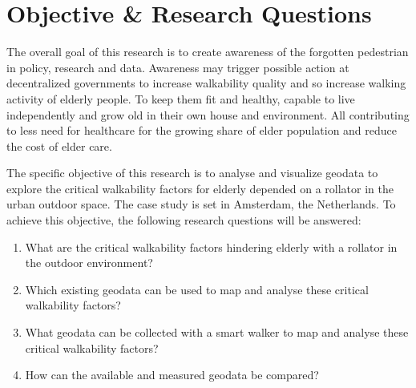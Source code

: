 \section{Objective \& Research Questions}
The overall goal of this research is to create awareness of the forgotten pedestrian in policy, research and data. Awareness may trigger possible action at decentralized governments to increase walkability quality and so increase walking activity of elderly people. To keep them fit and healthy, capable to live independently and grow old in their own house and environment. All contributing to less need for healthcare for the growing share of elder population and reduce the cost of elder care.

The specific objective of this research is to analyse and visualize geodata to explore the critical walkability factors for elderly depended on a rollator in the urban outdoor space. The case study is set in Amsterdam, the Netherlands. To achieve this objective, the following research questions will be answered:

\begin{enumerate}
	\item What are the critical walkability factors hindering elderly with a rollator in the outdoor environment?
	\item Which existing geodata can be used to map and analyse these critical walkability factors?
 	\item What geodata can be collected with a smart walker to map and analyse these critical walkability factors? 
	\item How can the available and measured geodata be compared? 
\end{enumerate}



